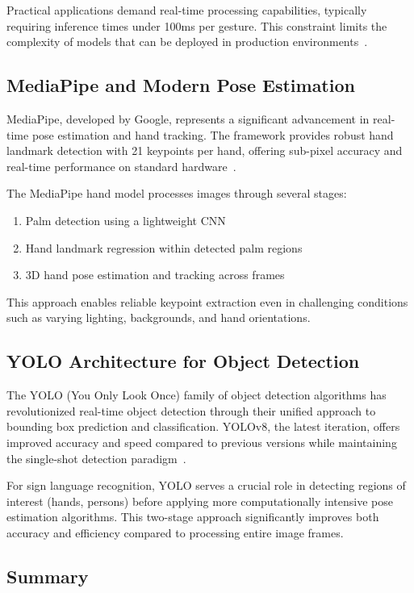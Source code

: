 \documentclass[11pt, a4paper]{article}
\begin{document}
Practical applications demand real-time processing capabilities, typically requiring inference times under 100ms per gesture. This constraint limits the complexity of models that can be deployed in production environments~\cite{Koller20}.

\subsection{MediaPipe and Modern Pose Estimation}

MediaPipe, developed by Google, represents a significant advancement in real-time pose estimation and hand tracking. The framework provides robust hand landmark detection with 21 keypoints per hand, offering sub-pixel accuracy and real-time performance on standard hardware~\cite{Zhang20}.

The MediaPipe hand model processes images through several stages:
\begin{enumerate}
    \item Palm detection using a lightweight CNN
    \item Hand landmark regression within detected palm regions
    \item 3D hand pose estimation and tracking across frames
\end{enumerate}

This approach enables reliable keypoint extraction even in challenging conditions such as varying lighting, backgrounds, and hand orientations.

\subsection{YOLO Architecture for Object Detection}

The YOLO (You Only Look Once) family of object detection algorithms has revolutionized real-time object detection through their unified approach to bounding box prediction and classification. YOLOv8, the latest iteration, offers improved accuracy and speed compared to previous versions while maintaining the single-shot detection paradigm~\cite{Ultralytics23}.

For sign language recognition, YOLO serves a crucial role in detecting regions of interest (hands, persons) before applying more computationally intensive pose estimation algorithms. This two-stage approach significantly improves both accuracy and efficiency compared to processing entire image frames.

\subsection{Summary}
\end{document}
